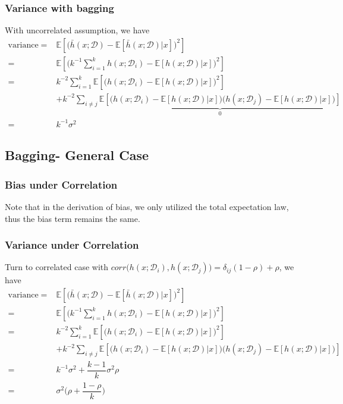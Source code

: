\documentclass[11pt,a4paper]{ctexart}
\numberwithin{equation}{section}%
\begin{document}
\subsubsection{Variance with bagging}

With uncorrelated assumption, we have
\begin{align*}
    \mathrm{ variance }=& \mathbb{E}\left[ \big( \bar{h}(x;\mathcal{D}) - \mathbb{E}\left[ \bar{h}(x;\mathcal{D})|x \right] \big)^2 \right] \\
    =&   \mathbb{E}\left[ \big( k^{-1}\sum_{i=1}^k h(x;\mathcal{D}_i) - \mathbb{E}\left[ h(x;\mathcal{D})|x \right] \big)^2 \right] \\
    =& k^{-2} \sum_{i=1}^k \mathbb{E}\left[ \big( h(x;\mathcal{D}_i) - \mathbb{E}\left[ h(x;\mathcal{D})|x \right] \big)^2 \right] \\
    &+ k^{-2} \sum_{i\neq j}  \underbrace{\mathbb{E}\left[ \big( h(x;\mathcal{D}_i) - \mathbb{E}\left[ h(x;\mathcal{D})|x \right] \big)\big( h(x;\mathcal{D}_j) - \mathbb{E}\left[ h(x;\mathcal{D})|x \right] \big) \right] }_{0} \\
    =& k^{-1} \sigma ^2  
\end{align*}


\subsection{Bagging- General Case}

\subsubsection{Bias under Correlation}

Note that in the derivation of bias, we only utilized the total expectation law, thus the bias term remains the same.

\subsubsection{Variance under Correlation}
Turn to correlated case with $ corr\big(h(x;\mathcal{D}_i), h(x;\mathcal{D}_j)\big) = \delta _{ij}(1-\rho )+\rho   $, we have 
\begin{align*}
    \mathrm{ variance }=& \mathbb{E}\left[ \big( \bar{h}(x;\mathcal{D}) - \mathbb{E}\left[ \bar{h}(x;\mathcal{D})|x \right] \big)^2 \right] \\
    =&   \mathbb{E}\left[ \big( k^{-1}\sum_{i=1}^k h(x;\mathcal{D}_i) - \mathbb{E}\left[ h(x;\mathcal{D})|x \right] \big)^2 \right] \\
    =& k^{-2} \sum_{i=1}^k \mathbb{E}\left[ \big( h(x;\mathcal{D}_i) - \mathbb{E}\left[ h(x;\mathcal{D})|x \right] \big)^2 \right] \\
    &+ k^{-2} \sum_{i\neq j}  \mathbb{E}\left[ \big( h(x;\mathcal{D}_i) - \mathbb{E}\left[ h(x;\mathcal{D})|x \right] \big)\big( h(x;\mathcal{D}_j) - \mathbb{E}\left[ h(x;\mathcal{D})|x \right] \big) \right]  \\
    =& k^{-1} \sigma ^2  + \dfrac{ k-1 }{ k }\sigma ^2 \rho \\
    =& \sigma ^2\big( \rho + \dfrac{ 1-\rho  }{ k }  \big) 
\end{align*}
\end{document}
